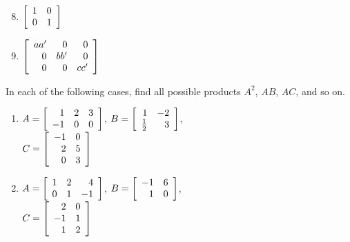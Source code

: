 \begin{multicols}{2}
\begin{ex}
\begin{sol}
\begin{enumerate}[label={\alph*.}]
\setcounter{enumi}{7}
\item 
$\left[ \begin{array}{rr}
1 & 0 \\
0 & 1
\end{array} \right]
$

\setcounter{enumi}{9}
\item  
$\left[ \begin{array}{rrr}
aa^\prime & 0 & 0 \\
0 & bb^\prime & 0 \\
0 & 0 & cc^\prime
\end{array} \right]
$

\end{enumerate}
\end{sol}
\end{ex}

\begin{ex}
In each of the following cases, find all possible products $A^{2}$, $AB$, $AC$, and so on.


\begin{enumerate}[label={\alph*.}]
\item
$A = \left[ \begin{array}{rrr}
1 & 2 & 3 \\
-1 & 0 & 0
\end{array} \right]$, 
$B = \left[ \begin{array}{rr}
1 & -2 \\
\tfrac{1}{2} & 3
\end{array} \right]$, \\
 $C = \left[ \begin{array}{rr}
-1 & 0 \\
2 & 5 \\
0 & 3
\end{array} \right]
$ 

\item
$A = \left[ \begin{array}{rrr}
	1 & 2 & 4 \\
	0 & 1 & -1
\end{array} \right]$, 
$B = \left[ \begin{array}{rr}
	-1 & 6 \\
	1 & 0
\end{array} \right]$, \\
$C = \left[ \begin{array}{rr}
	2 & 0 \\
	-1 & 1 \\
	1 & 2
\end{array} \right]
$


\end{enumerate}
\end{ex}
\end{multicols}
